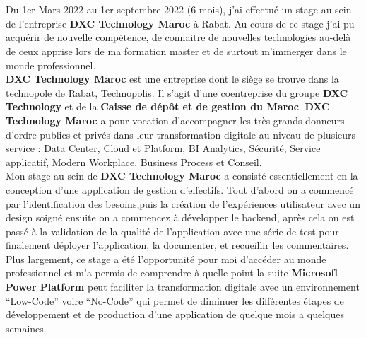 \titlespacing*{\chapter}{0pt}{0in}{0.3in}
\chapter*{}
\titlespacing*{\chapter}{0pt}{0.45in}{0.3in}%

Du 1er Mars 2022 au 1er septembre 2022 (6 mois), j’ai effectué un stage au sein de l’entreprise \textbf{DXC Technology Maroc} à Rabat. Au cours de ce stage j'ai pu acquérir de nouvelle compétence, de connaitre de nouvelles technologies au-delà de ceux apprise lors de ma formation master et de surtout m'immerger dans le monde professionnel. \\ 

\textbf{DXC Technology Maroc} est une entreprise dont le siège se trouve dans la technopole de Rabat, Technopolis. Il s’agit d’une coentreprise du groupe \textbf{DXC Technology} et de la \textbf{Caisse de dépôt et de gestion du Maroc}. \textbf{DXC Technology Maroc} a pour vocation d’accompagner les très grands donneurs d’ordre publics et privés dans leur transformation digitale au niveau de plusieurs service : Data Center, Cloud et Platform, BI Analytics, Sécurité, Service applicatif, Modern Workplace, Business Process et Conseil.\\ 

Mon stage au sein de \textbf{DXC Technology Maroc} a consisté essentiellement en la conception d'une application de gestion d'effectifs. Tout d'abord on a commencé par l'identification des besoins,puis la création de l'expériences utilisateur avec un design soigné ensuite on a commencez à développer le backend, après cela on est passé à la validation de la qualité de l'application avec une série de test pour finalement déployer l'application, la documenter, et recueillir les commentaires. Plus largement, ce stage a été l’opportunité pour moi d'accéder au monde professionnel et m’a permis de comprendre à quelle point la suite \textbf{Microsoft Power Platform} peut faciliter la transformation digitale avec un environnement “Low-Code” voire “No-Code” qui permet de diminuer les différentes étapes de développement et de production d'une application de quelque mois a quelques semaines.\\

